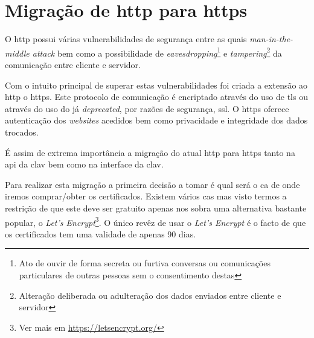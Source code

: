 
\section{Migração de \acrshort{http} para \acrshort{https}}

O \acrfull{http} possui várias vulnerabilidades de segurança entre as quais \textit{man-in-the-middle attack} bem como a possibilidade de \textit{eavesdropping}\footnote{Ato de ouvir de forma secreta ou furtiva conversas ou comunicações particulares de outras pessoas sem o consentimento destas} e \textit{tampering}\footnote{Alteração deliberada ou adulteração dos dados enviados entre cliente e servidor} da comunicação entre cliente e servidor.

Com o intuito principal de superar estas vulnerabilidades foi criada a extensão ao \acrshort{http} o \acrfull{https}. Este protocolo de comunicação é encriptado através do uso de \acrfull{tls} ou através do uso do já \textit{deprecated}, por razões de segurança, \acrfull{ssl}. O \acrshort{https} oferece autenticação dos \textit{websites} acedidos bem como privacidade e integridade dos dados trocados.  

É assim de extrema importância a migração do atual \acrshort{http} para \acrshort{https} tanto na \acrshort{api} da \acrshort{clav} bem como na interface da \acrshort{clav}.

Para realizar esta migração a primeira decisão a tomar é qual será o \acrfull{ca} de onde iremos comprar/obter os certificados. Existem vários \acrshort{ca}s mas visto termos a restrição de que este deve ser gratuito apenas nos sobra uma alternativa bastante popular, o \textit{Let's Encrypt}\footnote{Ver mais em \url{https://letsencrypt.org/}}. O único revêz de usar o \textit{Let's Encrypt} é o facto de que os certificados tem uma validade de apenas 90 dias.

